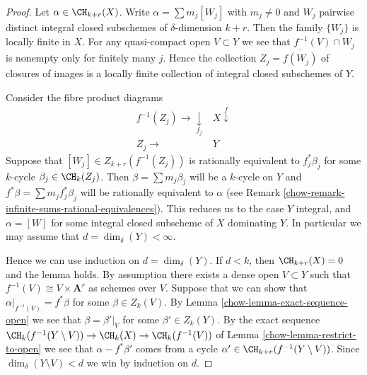 \begin{proof}

Let $\alpha \in \CH_{k + r}(X)$.
Write $\alpha = \sum m_j[W_j]$ with $m_j \not = 0$ and
$W_j$ pairwise distinct integral closed subschemes of
$\delta$-dimension $k + r$. Then the family $\{W_j\}$
is locally finite in $X$. For any quasi-compact open
$V \subset Y$ we see that $f^{-1}(V) \cap W_j$
is nonempty only for finitely many $j$. Hence the
collection $Z_j = \overline{f(W_j)}$ of closures
of images is a locally finite collection of integral
closed subschemes of $Y$.

\medskip\noindent
Consider the fibre product diagrams
$$
\begin{array}{cc}f^{-1}(Z_j) \longrightarrow\underset{f_j}{\downarrow} & X \overset{f}{\downarrow} \\ Z_j \longrightarrow & Y\end{array}
$$
Suppose that $[W_j] \in Z_{k + r}(f^{-1}(Z_j))$
is rationally equivalent to $f_j^*\beta_j$ for some
$k$-cycle $\beta_j \in \CH_k(Z_j)$. Then
$\beta = \sum m_j \beta_j$ will be a $k$-cycle on $Y$
and $f^*\beta = \sum m_j f_j^*\beta_j$ will be rationally
equivalent to $\alpha$ (see
Remark \ref{chow-remark-infinite-sums-rational-equivalences}).
This reduces us to the case $Y$ integral, and
$\alpha = [W]$ for some integral closed subscheme
of $X$ dominating $Y$. In particular we may
assume that $d = \dim_\delta(Y) < \infty$.

\medskip\noindent
Hence we can use induction on $d = \dim_\delta(Y)$.
If $d < k$, then $\CH_{k + r}(X) = 0$ and the lemma holds.
By assumption there exists a dense open $V \subset Y$ such
that $f^{-1}(V) \cong V \times \mathbf{A}^r$ as schemes over $V$.
Suppose that we can show that $\alpha|_{f^{-1}(V)} = f^*\beta$
for some $\beta \in Z_k(V)$. By Lemma \ref{chow-lemma-exact-sequence-open}
we see that
$\beta = \beta'|_V$ for some $\beta' \in Z_k(Y)$.
By the exact sequence
$\CH_k(f^{-1}(Y \setminus V)) \to \CH_k(X) \to \CH_k(f^{-1}(V))$
of Lemma \ref{chow-lemma-restrict-to-open}
we see that $\alpha - f^*\beta'$ comes from
a cycle $\alpha' \in \CH_{k + r}(f^{-1}(Y \setminus V))$.
Since $\dim_\delta(Y \setminus V) < d$ we win by
induction on $d$.


\end{proof}
